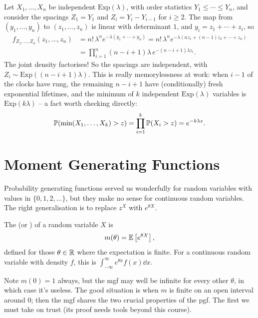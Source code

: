 \documentclass[a4paper]{scrartcl}
\begin{document}
\begin{example}
	Let $X_1, \dots, X_n$ be independent $\mathrm{Exp}(\lambda)$, with order statistics $Y_1 \leq \cdots \leq Y_n$, and consider the spacings $Z_1 = Y_1$ and $Z_i = Y_i - Y_{i - 1}$ for $i \geq 2$. The map from $(y_1, \dots, y_n)$ to $(z_1, \dots, z_n)$ is linear with determinant $1$, and $y_i = z_1 + \cdots + z_i$, so
	\begin{align*}
		f_{Z_1, \dots, Z_n}(z_1, \dots, z_n) &= n!\, \lambda^n e^{-\lambda(y_1 + \cdots + y_n)} = n!\,\lambda^n e^{-\lambda(nz_1 + (n-1)z_2 + \cdots + z_n)} \\
		&= \prod_{i = 1}^{n} (n - i + 1)\lambda \, e^{-(n - i + 1)\lambda z_i}.
	\end{align*}
	The joint density factorises! So the spacings are independent, with $Z_i \sim \mathrm{Exp}((n - i + 1)\lambda)$. This is really memorylessness at work: when $i - 1$ of the clocks have rung, the remaining $n - i + 1$ have (conditionally) fresh exponential lifetimes, and the minimum of $k$ independent $\mathrm{Exp}(\lambda)$ variables is $\mathrm{Exp}(k\lambda)$ -- a fact worth checking directly:
	$$
	\mathbb{P}(\min(X_1, \dots, X_k) > z) = \prod_{i=1}^k \mathbb{P}(X_i > z) = e^{-k\lambda z}.
	$$
\end{example}


\section{Moment Generating Functions}

Probability generating functions served us wonderfully for random variables with values in $\{0, 1, 2, \dots\}$, but they make no sense for continuous random variables. The right generalisation is to replace $z^X$ with $e^{\theta X}$.

\begin{definition}
	The  (or ) of a random variable $X$ is
	$$
	m(\theta) = \mathbb{E}\left[e^{\theta X}\right],
	$$
	defined for those $\theta \in \mathbb{R}$ where the expectation is finite. For a continuous random variable with density $f$, this is $\int_{-\infty}^{\infty} e^{\theta x}f(x)\dd x$.
\end{definition}

Note $m(0) = 1$ always, but the mgf may well be infinite for every other $\theta$, in which case it's useless. The good situation is when $m$ is finite on an open interval around $0$; then the mgf shares the two crucial properties of the pgf. The first we must take on trust (its proof needs tools beyond this course).
\end{document}
